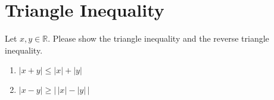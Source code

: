 \section{Triangle Inequality}
Let $x,y \in \mathbb{R}$.
Please show the triangle inequality and the reverse triangle inequality.
\begin{enumerate}
	\item $|x+y| \leq |x|+|y|$
	\item $|x-y| \geq \left|\, |x| - |y|\,\right|$
\end{enumerate}